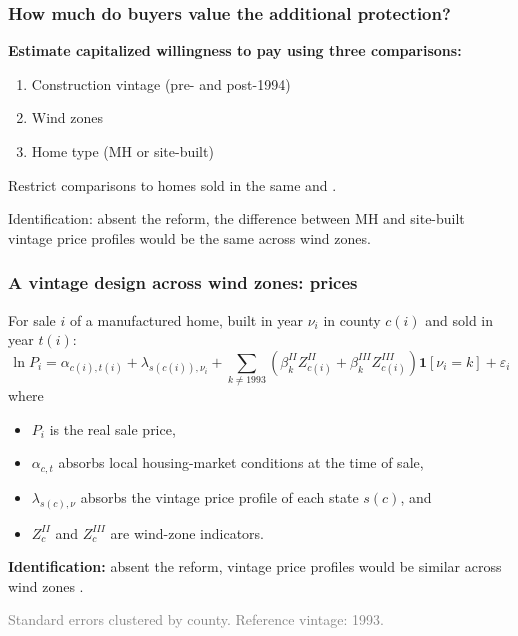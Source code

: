 \documentclass[11pt,xcolor={dvipsnames},hyperref={pdftex,pdfpagemode=UseNone,hidelinks,pdfdisplaydoctitle=true},usepdftitle=false,aspectratio=169]{beamer}
\newcommand{\gc}[1]{{\footnotesize\textcolor{gray}{#1}}}
\begin{document}
\begin{frame}[t]

    \frametitle{How much do buyers value the additional protection?}
    \textbf{Estimate capitalized willingness to pay using three comparisons:}

    \pause

    \vspace{0.5em}
    \begin{enumerate}\setlength{\itemsep}{1em}
        \item Construction vintage (pre- and post-1994)
        \item Wind zones
        \item Home type (MH or site-built)
    \end{enumerate}

    \vspace{0.8em}

    Restrict comparisons to homes sold in the same  and .

    \pause

    \vspace{2em}

    Identification: absent the reform, the difference between MH and site-built vintage price profiles would be the same across wind zones.

\end{frame}

\begin{frame}
    \frametitle{A vintage design across wind zones: prices}
    For sale $i$ of a manufactured home, built in year $\nu_i$ in county $c(i)$ and sold in year $t(i)$:
    \[
    \ln P_i = \alpha_{c(i),t(i)} + \lambda_{s(c(i)),\nu_i}
      + \sum_{k\neq 1993}\left(\beta^{II}_k Z^{II}_{c(i)} + \beta^{III}_k Z^{III}_{c(i)}\right)
      \mathbf{1}[\nu_i=k] + \varepsilon_i
    \]
    where
    \begin{itemize}
        \item $P_i$ is the real sale price,
        \item $\alpha_{c,t}$ absorbs local housing-market conditions at the time of sale,
        \item $\lambda_{s(c),\nu}$ absorbs the vintage price profile of each state $s(c)$, and
        \item $Z_c^{II}$ and $Z_c^{III}$ are wind-zone indicators.
    \end{itemize}
    \vspace{0.5em}
    \textbf{Identification:} absent the reform, vintage price profiles would be similar across wind zones .

    \vfill
    \gc{Standard errors clustered by county. Reference vintage: 1993.}
\end{frame}
\end{document}
